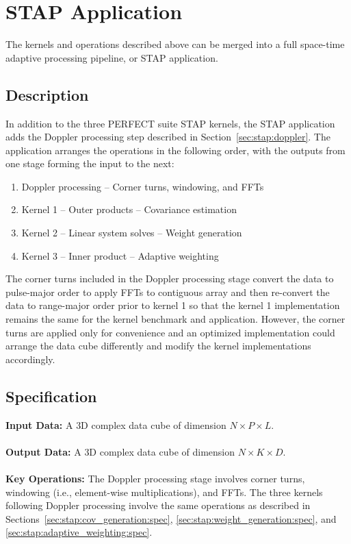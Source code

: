 \documentclass{report}
\begin{document}
\section{STAP Application}
\label{sec:stap:app}

The kernels and operations described above can be merged into a full
space-time adaptive processing pipeline, or STAP application.

\subsection{Description}

In addition to the three PERFECT suite STAP kernels, the STAP application
adds the Doppler processing step described in Section~\ref{sec:stap:doppler}.
The application arranges the operations in the following order, with the
outputs from one stage forming the input to the next:

\begin{enumerate}
    \item Doppler processing -- Corner turns, windowing, and FFTs
    \item Kernel 1 -- Outer products -- Covariance estimation
    \item Kernel 2 -- Linear system solves -- Weight generation
    \item Kernel 3 -- Inner product -- Adaptive weighting
\end{enumerate}

The corner turns included in the Doppler processing stage convert the data
to pulse-major order to apply FFTs to contiguous array and then re-convert
the data to range-major order prior to kernel 1 so that the kernel 1
implementation remains the same for the kernel benchmark and application.
However, the corner turns are applied only for convenience and an optimized
implementation could arrange the data cube differently and modify the
kernel implementations accordingly.

\subsection{Specification}

\textbf{Input Data:} A {3D} complex data cube of dimension $N \times P \times L$. \\ \\
\textbf{Output Data:}
A {3D} complex data cube of dimension $N \times K \times D$. \\ \\
\textbf{Key Operations:} 
The Doppler processing stage involves corner turns, windowing (i.e., element-wise
multiplications), and FFTs.
The three kernels following Doppler processing involve the same operations
as described in Sections~\ref{sec:stap:cov_generation:spec}, \ref{sec:stap:weight_generation:spec},
and \ref{sec:stap:adaptive_weighting:spec}.
\end{document}
